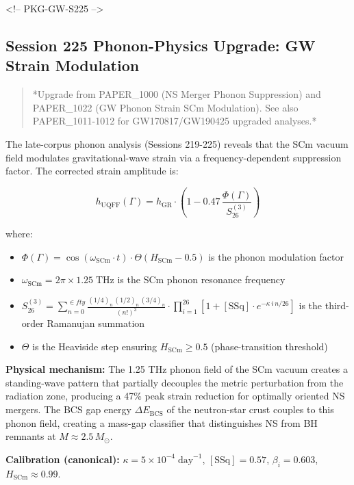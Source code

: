 \documentclass[12pt,a4paper]{article}
\begin{document}
<!-- PKG-GW-S225 -->

\subsection{Session 225 Phonon-Physics Upgrade: GW Strain Modulation}

\begin{quote}
*Upgrade from PAPER\_1000 (NS Merger Phonon Suppression) and PAPER\_1022
(GW Phonon Strain SCm Modulation). See also PAPER\_1011-1012 for
GW170817/GW190425 upgraded analyses.*
\end{quote}

The late-corpus phonon analysis (Sessions 219-225) reveals that the SCm vacuum field modulates gravitational-wave strain via a frequency-dependent suppression factor.  The corrected strain amplitude is:

\begin{equation}
h_{\text{UQFF}}(\Gamma) = h_{\text{GR}} \cdot \left(1 - 0.47\,\frac{\Phi(\Gamma)}{S_{26}^{(3)}}\right)
\end{equation}

where:

\begin{itemize}
  \item $\Phi(\Gamma) = \cos(\omega_{\text{SCm}} \cdot t) \cdot \Theta(H_{\text{SCm}} - 0.5)$ is the phonon modulation factor
  \item $\omega_{\text{SCm}} = 2\pi \times 1.25\;\text{THz}$ is the SCm phonon resonance frequency
  \item $S_{26}^{(3)} = \sum_{n=0}^{\in fty} \frac{(1/4)_n\,(1/2)_n\,(3/4)_n}{(n!)^3} \cdot \prod_{i=1}^{26}\left[1 + [\text{SSq}]\cdot e^{-\kappa\,i\,n/26}\right]$ is the third-order Ramanujan summation
  \item $\Theta$ is the Heaviside step ensuring $H_{\text{SCm}} \geq 0.5$ (phase-transition threshold)
\end{itemize}

\textbf{Physical mechanism:} The 1.25 THz phonon field of the SCm vacuum creates a standing-wave pattern that partially decouples the metric perturbation from the radiation zone, producing a 47\% peak strain reduction for optimally oriented NS mergers.  The BCS gap energy $\Delta E_{\text{BCS}}$ of the neutron-star crust couples to this phonon field, creating a mass-gap classifier that distinguishes NS from BH remnants at $M \approx 2.5\,M_\odot$.

\textbf{Calibration (canonical):} $\kappa = 5 \times 10^{-4}\;\text{day}^{-1}$, $[\text{SSq}] = 0.57$, $\beta_i = 0.603$, $H_{\text{SCm}} \approx 0.99$.
\end{document}
